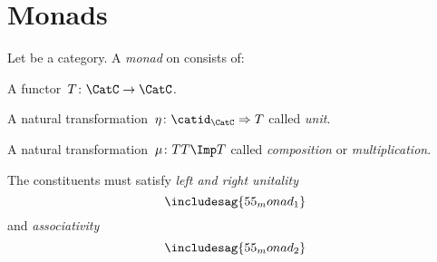 

\section{Monads}

\begin{ctdefinition}[Monad]
  Let \CatC be a category. A \emph{monad} on \CatC consists of:
  \begin{compactenum}
    \item A functor~$T \colon \CatC \to \CatC$.
    \item A natural transformation~$\eta \colon \catid_\CatC \Rightarrow T$ called \emph{unit}.
    \item A natural transformation~$\mu\colon TT\Imp T$ called \emph{composition} or \emph{multiplication}.
  \end{compactenum}
  The constituents must satisfy \emph{left and right unitality}
  \begin{equation}
    \includesag{55_monad_1}
  \end{equation}
  and \emph{associativity}
  \begin{equation}
    \includesag{55_monad_2}
  \end{equation}
\end{ctdefinition}
